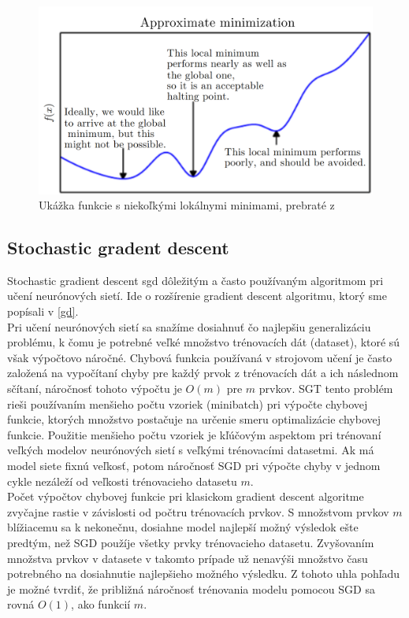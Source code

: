 \begin{figure}[H]
	\centering
	\includegraphics[width=0.75\linewidth]{img/gdglobalmin}
	\caption{Ukážka funkcie s niekoľkými lokálnymi minimami, prebraté z\cite[p.~85]{goodfellow2016deep}}
	\label{fig:gd_global_min}
\end{figure}

\subsection{Stochastic gradent descent} \label{l:sgt}
Stochastic gradient descent \acrshort{sgd} dôležitým a často používaným algoritmom pri učení neurónových sietí.
Ide o rozšírenie gradient descent algoritmu, ktorý sme popísali v \ref{gd}.\cite{goodfellow2016deep} \\

\indent Pri učení neurónových sietí sa snažíme dosiahnuť čo najlepšiu generalizáciu problému, k čomu je potrebné veľké množstvo trénovacích dát (dataset), ktoré sú však výpočtovo náročné.
Chybová funkcia používaná v strojovom učení je často založená na vypočítaní chyby pre každý prvok z trénovacích dát a ich následnom sčítaní, náročnosť tohoto výpočtu je $O(m)$ pre $m$ prvkov.
SGT tento problém rieši používaním menšieho počtu vzoriek (minibatch) pri výpočte chybovej funkcie, ktorých množstvo postačuje na určenie smeru optimalizácie chybovej funkcie. 
Použitie menšieho počtu vzoriek je kľúčovým aspektom pri trénovaní veľkých modelov neurónových sietí s veľkými trénovacími datasetmi.
Ak má model siete fixnú veľkosť, potom náročnosť SGD pri výpočte chyby v jednom cykle nezáleží od veľkosti trénovacieho datasetu $m$. \\

\indent Počet výpočtov chybovej funkcie pri klasickom gradient descent algoritme zvyčajne rastie v závislosti od počtru trénovacích prvkov.
S množstvom prvkov $m$ blížiacemu sa k nekonečnu, dosiahne model najlepší možný výsledok ešte predtým, než SGD použíje všetky prvky trénovacieho datasetu.
Zvyšovaním množstva prvkov v datasete v takomto prípade už nenavýši množstvo času potrebného na dosiahnutie najlepšieho možného výsledku.
Z tohoto uhla pohľadu je možné tvrdiť, že približná náročnosť trénovania modelu pomocou SGD sa rovná $O(1)$, ako funkcií $m$.\cite{goodfellow2016deep}

